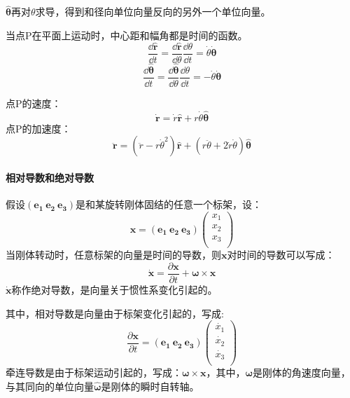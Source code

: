 $\hat{\boldsymbol{\theta}}$再对$\theta$求导，得到和径向单位向量反向的另外一个单位向量。

当点P在平面上运动时，中心距和幅角都是时间的函数。
\begin{equation}
	\frac{\dd \hat{\boldsymbol{r}}}{\dd t}=\frac{\dd\hat{\boldsymbol{r}} }{\dd\theta }\frac{\dd\theta }{\dd t}=\dot{\theta}\boldsymbol{\dot{\theta}}
\end{equation}
\begin{equation}
	\frac{\dd\hat{\boldsymbol{\theta}}}{\dd t}=\frac{\dd\hat{\boldsymbol{\theta}}}{\dd\theta }\frac{\dd\theta }{\dd t}=-\dot{\theta}\boldsymbol{\dot{\theta}}
\end{equation}

\noindent 点P的速度：
\begin{equation}
	\dot{\boldsymbol{r}}=\dot{r}\hat{\boldsymbol{r}}+r\dot{\theta}\hat{\boldsymbol{\theta}}
\end{equation}
点P的加速度：
\begin{equation}
	\ddot{\boldsymbol{r}}=\left(\ddot{r}-r\dot{\theta}^2\right)\hat{\boldsymbol{r}}+\left(r\ddot{\theta}+2\dot{r}\dot{\theta}\right)\hat{\boldsymbol{\theta}}
\end{equation}
\paragraph{相对导数和绝对导数}
假设$(\boldsymbol{e_{1}} \ \boldsymbol{e_{2}} \ \boldsymbol{e_{3}})$是和某旋转刚体固结的任意一个标架，设：
\begin{equation}
	\boldsymbol{x}=(\boldsymbol{e_{1}} \ \boldsymbol{e_{2}} \ \boldsymbol{e_{3}})\begin{pmatrix}
		x_{1}\\
		x_{2}\\
		x_{3}\\
	\end{pmatrix}
\end{equation}
当刚体转动时，任意标架的向量是时间的导数，则$\boldsymbol{x}$对时间的导数可以写成：
\begin{equation}
	\dot{\boldsymbol{x}}=\frac{\partial\boldsymbol{x}}{\partial t}+\boldsymbol{\omega}\times \boldsymbol{x}
\end{equation}
$\dot{\boldsymbol{x}}$称作绝对导数，是向量关于惯性系变化引起的。

其中，相对导数是向量由于标架变化引起的，写成:
\begin{equation}
	\frac{\partial\boldsymbol{x}}{\partial t}=(\boldsymbol{e_{1}} \ \boldsymbol{e_{2}} \ \boldsymbol{e_{3}})\begin{pmatrix}
		\dot{x_{1}}\\
		\dot{x_{2}}\\
		\dot{x_{3}}\\
	\end{pmatrix}
\end{equation}
牵连导数是由于标架运动引起的，写成：$\boldsymbol{\omega}\times \boldsymbol{x}$，其中，$\boldsymbol{\omega}$是刚体的角速度向量，与其同向的单位向量$\hat{\boldsymbol{\omega}}$是刚体的瞬时自转轴。
